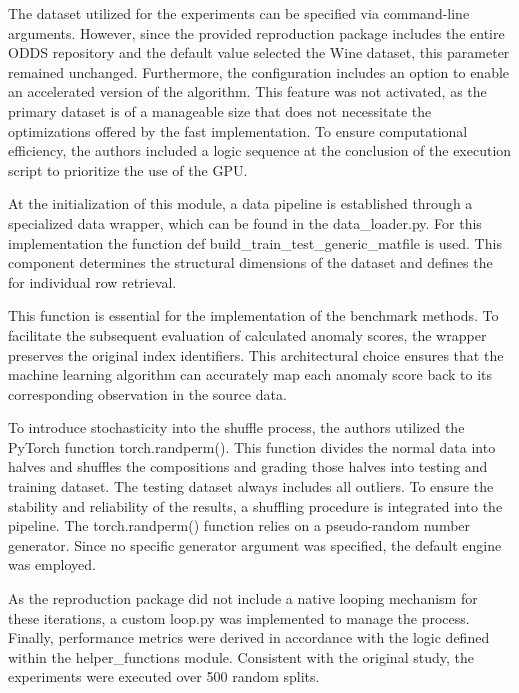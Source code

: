 The dataset utilized for the experiments can be specified via command-line arguments.
However, since the provided reproduction package includes the entire ODDS repository and the default value selected the Wine dataset, this parameter remained unchanged. 
Furthermore, the configuration includes an option to enable an accelerated version of the algorithm. 
This feature was not activated, as the primary dataset is of a manageable size that does not necessitate the optimizations offered by the fast implementation. 
To ensure computational efficiency, the authors included a logic sequence at the conclusion of the execution script to prioritize the use of the GPU. 


At the initialization of this module, a data pipeline is established through a specialized data wrapper, which can be found in the data\_loader.py. 
For this implementation the function def build\_train\_test\_generic\_matfile is used.
This component determines the structural dimensions of the dataset and defines the  for individual row retrieval.


This function is essential for the implementation of the benchmark methods. 
To facilitate the subsequent evaluation of calculated anomaly scores, the wrapper preserves the original index identifiers. 
This architectural choice ensures that the machine learning algorithm can accurately map each anomaly score back to its corresponding observation in the source data.


To introduce stochasticity into the shuffle process, the authors utilized the PyTorch \citep{paszke2019pytorch} function torch.randperm().
This function divides the normal data into halves and shuffles the compositions and grading those halves into testing and training dataset.
The testing dataset always includes all outliers.  
To ensure the stability and reliability of the results, a shuffling procedure is integrated into the pipeline. 
The torch.randperm() function relies on a pseudo-random number generator.
Since no specific generator argument was specified, the default engine was employed. 


As the reproduction package did not include a native looping mechanism for these iterations, a custom loop.py was implemented to manage the process. 
Finally, performance metrics were derived in accordance with the logic defined within the helper\_functions module.
Consistent with the original study, the experiments were executed over 500 random splits. 


